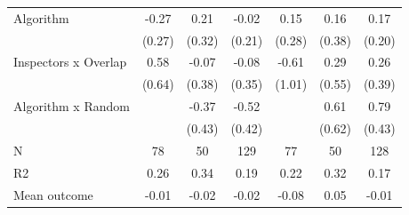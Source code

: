 \begin{tabular}{lccc|ccc}
Algorithm   &       -0.27         &        0.21         &       -0.02         &        0.15         &        0.16         &        0.17         \\
            &      (0.27)         &      (0.32)         &      (0.21)         &      (0.28)         &      (0.38)         &      (0.20)         \\
\addlinespace
Inspectors x Overlap&        0.58         &       -0.07         &       -0.08         &       -0.61         &        0.29         &        0.26         \\
            &      (0.64)         &      (0.38)         &      (0.35)         &      (1.01)         &      (0.55)         &      (0.39)         \\
\addlinespace
Algorithm x Random&                     &       -0.37         &       -0.52         &                     &        0.61         &        0.79\sym{*}  \\
            &                     &      (0.43)         &      (0.42)         &                     &      (0.62)         &      (0.43)         \\
\midrule
N           &          78         &          50         &         129         &          77         &          50         &         128         \\
R2          &        0.26         &        0.34         &        0.19         &        0.22         &        0.32         &        0.17         \\
Mean outcome&       -0.01         &       -0.02         &       -0.02         &       -0.08         &        0.05         &       -0.01         \\
\bottomrule \end{tabular}
